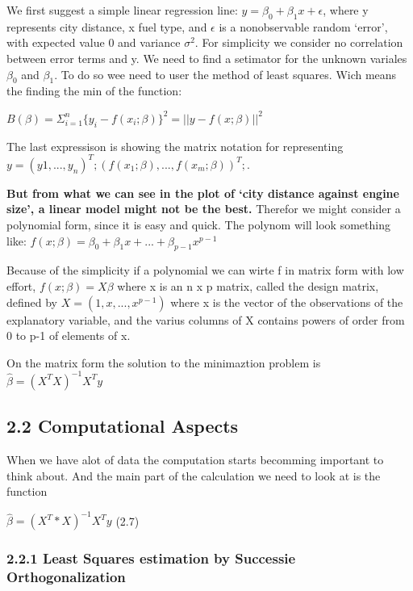 \documentclass[
]{article}
\begin{document}
We first suggest a simple linear regression line:
\(y = \beta_{0} + \beta_{1} x + \epsilon\), where y represents city
distance, x fuel type, and \(\epsilon\) is a nonobservable random
`error', with expected value 0 and variance \(\sigma^2\). For simplicity
we consider no correlation between error terms and y. We need to find a
setimator for the unknown variales \(\beta_{0}\) and \(\beta_{1}\). To
do so wee need to user the method of least squares. Wich means the
finding the min of the function:

\center \(B(\beta)=\Sigma_{i=1}^n \{y_{i} -f(x_{i};\beta) \}^2 = ||y-f(x;\beta)||^2\)
\center

The last expressison is showing the matrix notation for representing
\(y = (y1,...,y_{n})^T; (f(x_{1};\beta),...,f(x_{m};\beta))^T;\).

\textbf{But from what we can see in the plot of `city distance against
engine size', a linear model might not be the best.} Therefor we might
consider a polynomial form, since it is easy and quick. The polynom will
look something like:
\center \(f(x;\beta) = \beta_{0} + \beta_{1} x + ... + \beta_{p-1} x^{p-1}\)
\center

Because of the simplicity if a polynomial we can wirte f in matrix form
with low effort, \center \(f(x;\beta)= X\beta\) \center where x is an n
x p matrix, called the design matrix, defined by
\cnter \(X=(1,x,...,x^{p-1})\) \center where x is the vector of the
observations of the explanatory variable, and the varius columns of X
contains powers of order from 0 to p-1 of elements of x.

On the matrix form the solution to the minimaztion problem is
\center \(\hat{\beta} = (X^{T}X)^{-1}X^{T}y\)

\hypertarget{computational-aspects}{%
\subsection{2.2 Computational Aspects}\label{computational-aspects}}

When we have alot of data the computation starts becomming important to
think about. And the main part of the calculation we need to look at is
the function

\center \(\hat{\beta} = (X^{T}*X)^{-1} X^{T} y\) \center (2.7)

\hypertarget{least-squares-estimation-by-successie-orthogonalization}{%
\subsubsection{2.2.1 Least Squares estimation by Successie
Orthogonalization}\label{least-squares-estimation-by-successie-orthogonalization}}
\end{document}
